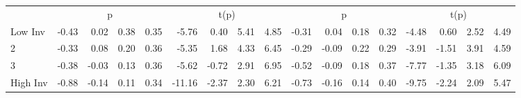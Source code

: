 \begin{table}[!ht]
\begin{tabular}{lrrrrrrrrrrrrrrrr}
  
     & \multicolumn{4}{c}{p} & \multicolumn{4}{c}{t(p)}  & \multicolumn{4}{c}{p} & \multicolumn{4}{c}{t(p)}   \\
     \cmidrule(r){2-5} \cmidrule(r){6-9}  \cmidrule(r){10-13} \cmidrule(r){14-17} 
    Low Inv  & -0.43  & 0.02  & 0.38  & 0.35  & -5.76  & 0.40  & 5.41  & 4.85  & -0.31  & 0.04  & 0.18  & 0.32  & -4.48  & 0.60  & 2.52  & 4.49   \\
    2  & -0.33  & 0.08  & 0.20  & 0.36  & -5.35  & 1.68  & 4.33  & 6.45  & -0.29  & -0.09  & 0.22  & 0.29  & -3.91  & -1.51  & 3.91  & 4.59   \\
    3  & -0.38  & -0.03  & 0.13  & 0.36  & -5.62  & -0.72  & 2.91  & 6.95  & -0.52  & -0.09  & 0.18  & 0.37  & -7.77  & -1.35  & 3.18  & 6.09   \\
    High Inv  & -0.88  & -0.14  & 0.11  & 0.34  & -11.16  & -2.37  & 2.30  & 6.21  & -0.73  & -0.16  & 0.14  & 0.40  & -9.75  & -2.24  & 2.09  & 5.47   \\
    
  
  \bottomrule
\end{tabular}
\label{tbl:32_Size_OP_Inv_B16}
\end{table}